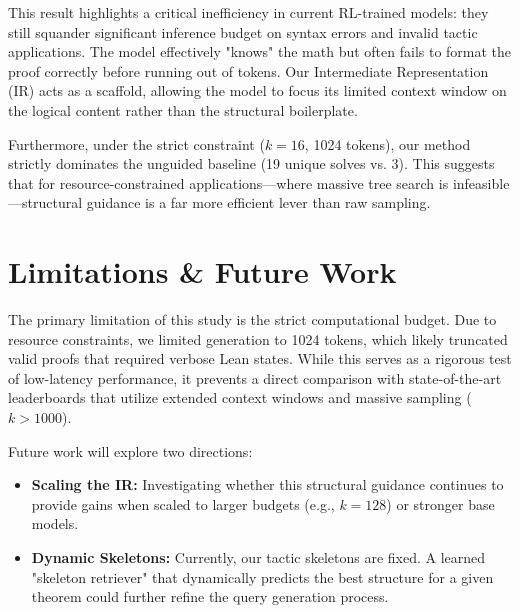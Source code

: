 \documentclass{article}
\begin{document}
This result highlights a critical inefficiency in current RL-trained models: they still squander significant inference budget on syntax errors and invalid tactic applications. The model effectively "knows" the math but often fails to format the proof correctly before running out of tokens. Our Intermediate Representation (IR) acts as a scaffold, allowing the model to focus its limited context window on the logical content rather than the structural boilerplate.

Furthermore, under the strict constraint ($k=16$, 1024 tokens), our method strictly dominates the unguided baseline (19 unique solves vs. 3). This suggests that for resource-constrained applications—where massive tree search is infeasible—structural guidance is a far more efficient lever than raw sampling.

\section{Limitations \& Future Work}
The primary limitation of this study is the strict computational budget. Due to resource constraints, we limited generation to 1024 tokens, which likely truncated valid proofs that required verbose Lean states. While this serves as a rigorous test of low-latency performance, it prevents a direct comparison with state-of-the-art leaderboards that utilize extended context windows and massive sampling ($k > 1000$).

Future work will explore two directions:
\begin{itemize}
    \item \textbf{Scaling the IR:} Investigating whether this structural guidance continues to provide gains when scaled to larger budgets (e.g., $k=128$) or stronger base models.
    \item \textbf{Dynamic Skeletons:} Currently, our tactic skeletons are fixed. A learned "skeleton retriever" that dynamically predicts the best structure for a given theorem could further refine the query generation process.
\end{itemize}



\end{document}

